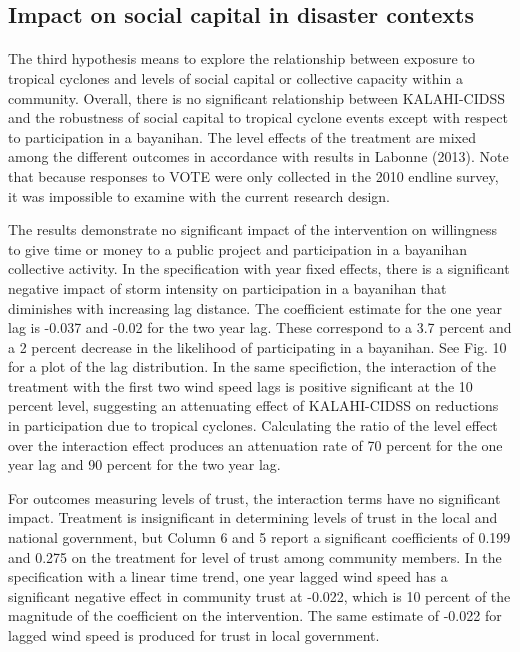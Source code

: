 \documentclass[12pt]{article}
\begin{document}
	\subsection{Impact on social capital in disaster contexts}

	\paragraph{ } The third hypothesis means to explore the relationship between exposure to tropical cyclones and levels of social capital or collective capacity within a community. Overall, there is no significant relationship between KALAHI-CIDSS and the robustness of social capital to tropical cyclone events except with respect to participation in a bayanihan. The level effects of the treatment are mixed among the different outcomes in accordance with results in Labonne (2013). Note that because responses to VOTE were only collected in the 2010 endline survey, it was impossible to examine with the current research design.

	The results demonstrate no significant impact of the intervention on willingness to give time or money to a public project and participation in a bayanihan collective activity. In the specification with year fixed effects, there is a significant negative impact of storm intensity on participation in a bayanihan that diminishes with increasing lag distance. The coefficient estimate for the one year lag is -0.037 and -0.02 for the two year lag. These correspond to a 3.7 percent and a 2 percent decrease in the likelihood of participating in a bayanihan. See Fig. 10 for a plot of the lag distribution. In the same specifiction, the interaction of the treatment with the first two wind speed lags is positive significant at the 10 percent level, suggesting an attenuating effect of KALAHI-CIDSS on reductions in participation due to tropical cyclones. Calculating the ratio of the level effect over the interaction effect produces an attenuation rate of 70 percent for the one year lag and 90 percent for the two year lag. 

	For outcomes measuring levels of trust, the interaction terms have no significant impact. Treatment is insignificant in determining levels of trust in the local and national government, but Column 6 and 5 report a significant coefficients of 0.199 and 0.275 on the treatment for level of trust among community members. In the specification with a linear time trend, one year lagged wind speed has a significant negative effect in community trust at -0.022, which is 10 percent of the magnitude of the coefficient on the intervention. The same estimate of -0.022 for lagged wind speed is produced for trust in local government. 
\end{document}
